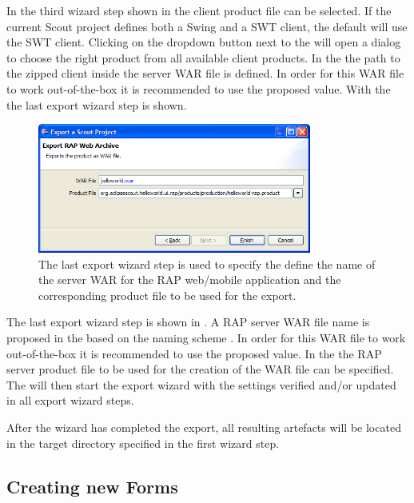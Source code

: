 \documentclass[a4paper,10pt,twoside]{book}
\begin{document}
In the third wizard step shown in  the client product file can be selected. 
If the current Scout project defines both a Swing and a SWT client, the default will use the SWT client. 
Clicking on the dropdown button next to the  will open a  dialog to choose the right product from all available client products. 
In the  the path to the zipped client inside the server WAR file is defined. 
In order for this WAR file to work out-of-the-box it is recommended to use the proposed value. 
With the  the last export wizard step is shown.

\begin{figure}
\includegraphics[width=9cm]{wizard_export_rap_server.png}
\caption{The last export wizard step is used to specify the define the name of the server WAR for the RAP web/mobile application and the corresponding product file to be used for the export.}
\end{figure}

The last export wizard step is shown in . 
A RAP server WAR file name is proposed in the  based on the naming scheme . 
In order for this WAR file to work out-of-the-box it is recommended to use the proposed value. 
In the  the RAP server product file to be used for the creation of the WAR file can be specified. 
The  will then start the export wizard with the settings verified and/or updated in all export wizard steps. 

After the wizard has completed the export, all resulting artefacts will be located in the target directory specified in the first wizard step. 

\subsection{Creating new Forms}
\end{document}
